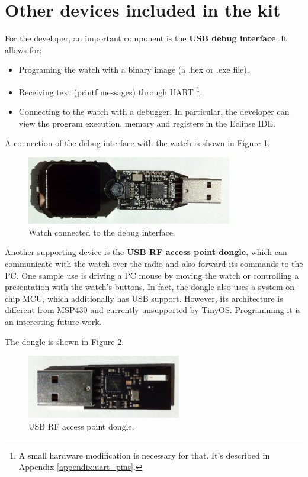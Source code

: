 \section{Other devices included in the kit}

For the developer, an important component is the {\bf USB debug
interface}. It allows for:
\begin{itemize}
  \item Programing the watch with a binary image (a .hex or .exe file).
  \item Receiving text (printf messages) through UART \footnote{A small
    hardware modification is necessary for that. It's described in
    Appendix \ref{appendix:uart_pins}.}.
  \item Connecting to the watch with a debugger. In particular, the
    developer can view the program execution, memory and registers in
    the Eclipse IDE.
\end{itemize}
A connection of the debug interface with the watch is shown in Figure
\ref{fig:chronos_dongle}.

\begin{figure}[h]
  \centering
  \includegraphics[width=0.8\textwidth]{img/chronos_dongle.jpg}
  \caption{Watch connected to the debug interface.}
  \label{fig:chronos_dongle}
\end{figure}

Another supporting device is the {\bf USB RF access point dongle},
which can communicate with the watch over the radio and also forward
its commands to the PC. One sample use is driving a PC mouse by
moving the watch or controlling a presentation with the watch's
buttons. In fact, the dongle also uses a system-on-chip MCU, which
additionally has USB support. However, its architecture is different
from MSP430 and currently unsupported by TinyOS. Programming it is an
interesting future work.

The dongle is shown in Figure \ref{fig:chronos_rfdongle}.

\begin{figure}[h]
  \centering
  \includegraphics[width=0.6\textwidth]{img/chronos_rfdongle.jpg}
  \caption{USB RF access point dongle.}
  \label{fig:chronos_rfdongle}
\end{figure}

